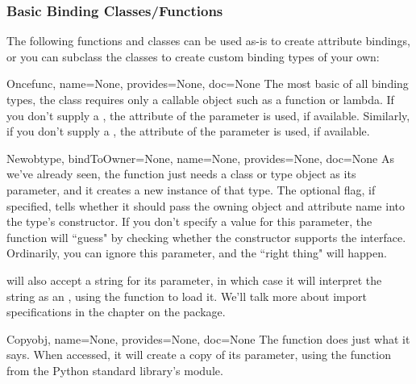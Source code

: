 \begin{verbatim%
}
\begin{verbatim%
}
\begin{verbatim%
}
\begin{verbatim%
}
\begin{verbatim%
}
\begin{verbatim%
}
\begin{verbatim%
}
\begin{verbatim%
}
\begin{verbatim%
}
\begin{description}
\end{description}






\subsubsection{Basic Binding Classes/Functions}

The following functions and classes can be used as-is to create attribute
bindings, or you can subclass the classes to create custom binding types
of your own:

\begin{funcdesc}{Once}{func, name=None, provides=None, doc=None}
The most basic of all binding types, the  class requires
only a callable object such as a function or lambda.  If you don't supply a
, the  attribute of the  parameter is used,
if available.  Similarly, if you don't supply a , the  
attribute of the  parameter is used, if available.
\end{funcdesc}

\begin{funcdesc}{New}{obtype, bindToOwner=None, name=None, provides=None,
doc=None}
As we've already seen, the  function just needs a class or
type object as its  parameter, and it creates a new instance of that
type.  The optional  flag, if specified, tells
 whether it should pass the owning object and 
attribute name into the type's constructor.  If you don't specify a value for
this parameter, the  function will ``guess" by checking
whether the constructor supports the  interface.
Ordinarily, you can ignore this parameter, and the ``right thing" will happen.

 will also accept a string for its  parameter,
in which case it will interpret the string as an ,
using the  function to load it.  We'll
talk more about import specifications in the chapter on the
 package.
\end{funcdesc}

\begin{funcdesc}{Copy}{obj, name=None, provides=None, doc=None}
The  function does just what it says.  When accessed, it
will create a copy of its  parameter, using the 
function from the Python standard library's  module.
\end{funcdesc}





\end{verbatim%
}
\end{verbatim%
}
\end{verbatim%
}
\end{verbatim%
}
\end{verbatim%
}
\end{verbatim%
}
\end{verbatim%
}
\end{verbatim%
}
\end{verbatim%
}
